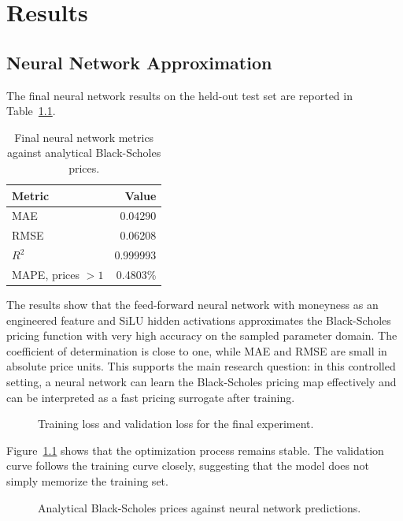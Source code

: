 \chapter{Results}

\section{Neural Network Approximation}

The final neural network results on the held-out test set are reported in Table~\ref{tab:nn-final-metrics}.

\begin{table}[H]
    \centering
    \begin{tabular}{lr}
        \toprule
        Metric & Value \\
        \midrule
        MAE & 0.04290 \\
        RMSE & 0.06208 \\
        $R^2$ & 0.999993 \\
        MAPE, prices $> 1$ & 0.4803\% \\
        \bottomrule
    \end{tabular}
    \caption{Final neural network metrics against analytical Black-Scholes prices.}
    \label{tab:nn-final-metrics}
\end{table}

The results show that the feed-forward neural network with moneyness as an engineered feature and SiLU hidden activations approximates the Black-Scholes pricing function with very high accuracy on the sampled parameter domain.
The coefficient of determination is close to one, while MAE and RMSE are small in absolute price units.
This supports the main research question: in this controlled setting, a neural network can learn the Black-Scholes pricing map effectively and can be interpreted as a fast pricing surrogate after training.

\begin{figure}[H]
    \centering
    \caption{Training loss and validation loss for the final experiment.}
    \label{fig:final-loss}
\end{figure}

Figure~\ref{fig:final-loss} shows that the optimization process remains stable.
The validation curve follows the training curve closely, suggesting that the model does not simply memorize the training set.

\begin{figure}[H]
    \centering
    \caption{Analytical Black-Scholes prices against neural network predictions.}
    \label{fig:final-true-vs-predicted}
\end{figure}

